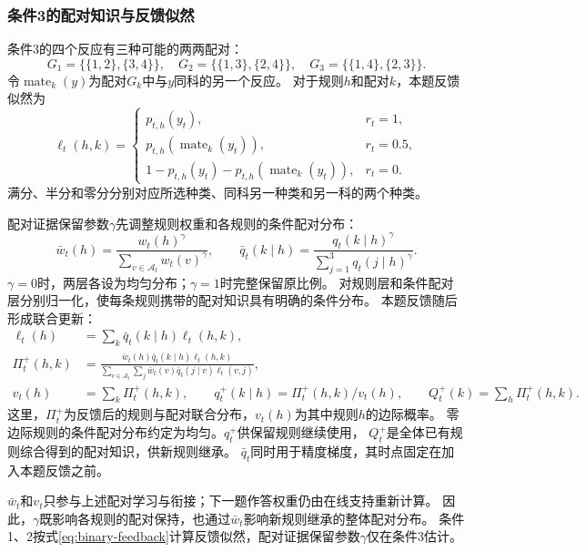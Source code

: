 \documentclass[11pt,a4paper]{article}
\numberwithin{equation}{section}
\newcommand{\A}{\mathcal{A}}
\begin{document}
\subsubsection{条件3的配对知识与反馈似然}
\label{sec:pairing}
条件3的四个反应有三种可能的两两配对：
\begin{equation}
G_1=\{\{1,2\},\{3,4\}\},\quad G_2=\{\{1,3\},\{2,4\}\},\quad
G_3=\{\{1,4\},\{2,3\}\}.
\end{equation}
令$\operatorname{mate}_k(y)$为配对$G_k$中与$y$同科的另一个反应。
对于规则$h$和配对$k$，本题反馈似然为
\begin{equation}
\ell_t(h,k)=\begin{cases}
p_{t,h}(y_t),&r_t=1,\\
p_{t,h}(\operatorname{mate}_k(y_t)),&r_t=0.5,\\
1-p_{t,h}(y_t)-p_{t,h}(\operatorname{mate}_k(y_t)),&r_t=0.
\end{cases}
\label{eq:pair-likelihood}
\end{equation}
满分、半分和零分分别对应所选种类、同科另一种类和另一科的两个种类。

配对证据保留参数$\gamma$先调整规则权重和各规则的条件配对分布：
\begin{equation}
\bar w_t(h)=\frac{w_t(h)^\gamma}{\sum_{v\in\A_t}w_t(v)^\gamma},\qquad
\bar q_t(k\mid h)=\frac{q_t(k\mid h)^\gamma}{\sum_{j=1}^3q_t(j\mid h)^\gamma}.
\label{eq:pair-forgetting}
\end{equation}
$\gamma=0$时，两层各设为均匀分布；$\gamma=1$时完整保留原比例。
对规则层和条件配对层分别归一化，使每条规则携带的配对知识具有明确的条件分布。
本题反馈随后形成联合更新：
\begin{align}
\ell_t(h)&=\sum_k\bar q_t(k\mid h)\ell_t(h,k),\\
\Pi_t^+(h,k)&=\frac{\bar w_t(h)\bar q_t(k\mid h)\ell_t(h,k)}
{\sum_{v\in\A_t}\sum_j\bar w_t(v)\bar q_t(j\mid v)\ell_t(v,j)},\\
v_t(h)&=\sum_k\Pi_t^+(h,k),\qquad
q_t^+(k\mid h)=\Pi_t^+(h,k)/v_t(h),\qquad Q_t^+(k)=\sum_h\Pi_t^+(h,k).
\label{eq:pair-update}
\end{align}
这里，$\Pi_t^+$为反馈后的规则与配对联合分布，$v_t(h)$为其中规则$h$的边际概率。
零边际规则的条件配对分布约定为均匀。$q_t^+$供保留规则继续使用，
$Q_t^+$是全体已有规则综合得到的配对知识，供新规则继承。
$\bar q_t$同时用于精度梯度，其时点固定在加入本题反馈之前。

$\bar w_t$和$v_t$只参与上述配对学习与衔接；下一题作答权重仍由在线支持重新计算。
因此，$\gamma$既影响各规则的配对保持，也通过$\bar w_t$影响新规则继承的整体配对分布。
条件1、2按式\eqref{eq:binary-feedback}计算反馈似然，配对证据保留参数$\gamma$仅在条件3估计。
\end{document}
